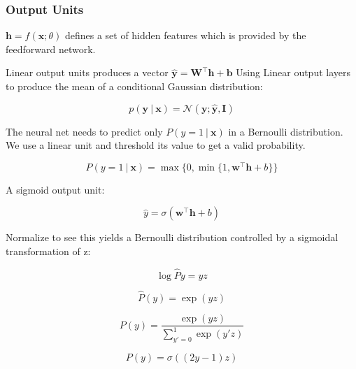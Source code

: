 \subsubsection{Output Units}
$\bm{h}=\mathit{f}(\bm{x};\theta)$ defines a set of hidden features which is provided by the feedforward network.

Linear output units produces a vector $\hat{\bm{y}}=\bm{W}^\top\bm{h}+\bm{b}$
Using Linear output layers to produce the mean of a conditional Gaussian distribution:

  \begin{equation} \tag{6.17}
   \label{eq_6_17}
   \mathit{p}(\bm{y}\ |\ \bm{x})=\mathcal{N}(\bm{y};\hat{\bm{y}},\bm{I})
  \end{equation}

The neural net needs to predict only $P(y=1\ |\ \bm{x})$ in a Bernoulli distribution.
We use a linear unit and threshold its value to get a valid probability.

  \begin{equation} \tag{6.18}
   \label{eq_6_18}
   P(y=1\ |\ \bm{x})=\max\{0,\min\{1,\bm{w}^\top\bm{h}+b\}\}
  \end{equation}
  
A sigmoid output unit:

  \begin{equation} \tag{6.19}
   \label{eq_6_19}
   \hat{y}=\sigma(\bm{w}^\top\bm{h}+b)
  \end{equation}
  
Normalize to see this yields a Bernoulli distribution controlled by a sigmoidal transformation of z:

  \begin{equation} \tag{6.20}
   \label{eq_6_20}
   \log\hat{P}{y}=yz
  \end{equation}
  
  \begin{equation} \tag{6.21}
   \label{eq_6_21}
   \hat{P}(y)=\exp(yz)
  \end{equation}
  
  \begin{equation} \tag{6.22}
   \label{eq_6_22}
   P(y)=\frac{\exp(yz)}{\sum_{y'=0}^{1}\exp(y'z)}
  \end{equation}
  
  \begin{equation} \tag{6.23}
   \label{eq_6_23}
   P(y)=\sigma((2y-1)z)
  \end{equation}
  
